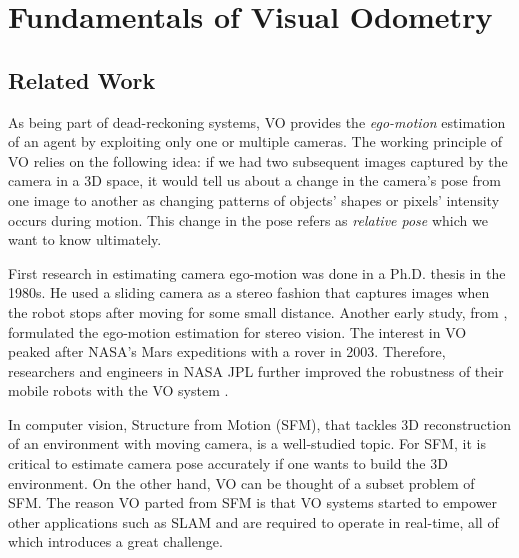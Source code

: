 \documentclass[12pt]{report}
\numberwithin{figure}{section}
\begin{document}
\chapter{Fundamentals of Visual Odometry} \label{cp_vo}

\section{Related Work} \label{sc_visual_odometry_related_works}

As being part of dead-reckoning systems, VO provides the \textit{ego-motion}
estimation of an agent by exploiting only one or multiple cameras. The working
principle of VO relies on the following idea: if we had two subsequent images
captured by the camera in a 3D space, it would tell us about a change in the 
camera's
pose from one image to another as changing patterns of objects' shapes or
pixels' intensity occurs during motion.  This change in the pose refers as
\textit{relative pose} which we want to know ultimately.

First research in estimating camera ego-motion was done in a Ph.D. thesis 
\parencite{Moravec1980} in the 1980s. He used a sliding camera as a stereo 
fashion 
that captures images when the robot stops after moving for some small 
distance. Another early study, from  
\parencite{Matthies1987a}, 
formulated the ego-motion estimation for stereo vision. The interest in VO 
peaked after NASA's Mars expeditions with a rover in 2003. Therefore, 
researchers and 
engineers in NASA JPL further improved the robustness of their mobile robots 
with the VO system \parencite{Olson2003}.

In computer vision, Structure from Motion (SFM), that tackles 3D 
reconstruction of an environment with moving camera, is a well-studied topic. 
For SFM, it is critical to estimate camera pose accurately if one wants to 
build the 3D 
environment. On the other hand, VO can be thought of a subset problem of SFM. 
The reason VO 
parted 
from SFM is that VO systems started to empower other applications such as SLAM 
and are required to operate in real-time, all of which introduces a great 
challenge.
\end{document}
